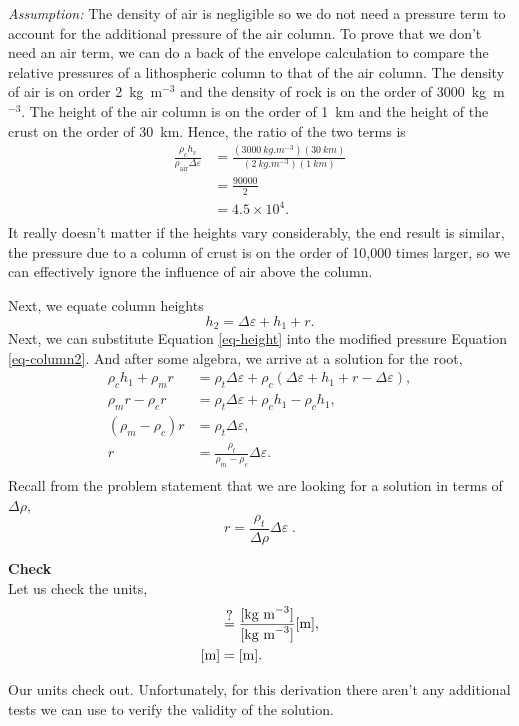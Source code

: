 \documentclass[final,a4paper,12pt]{article}
\newcommand\qeq{\stackrel{\mathclap{\normalfont\mbox{?}}}{=}}
\begin{document}
\begin{framed}
{\it Assumption:} The density of air is negligible so we do not need a pressure term to account for the additional pressure of the air column.  To prove that we don't need an air term, we can do a back of the envelope calculation to compare the relative pressures of a lithospheric column to that of the air column.  The density of air is on order 2~kg~m$^{-3}$ and the density of rock is on the order of 3000~kg~m$^{-3}$.  The height of the air column is on the order of 1~km and the height of the crust on the order of 30~km.  Hence, the ratio of the two terms is
\begin{align*}
    \frac{\rho_c h_c}{\rho_{\mathrm{air}} \Delta \varepsilon} &=
    \frac{(\SI{3000}{kg.m^{-3}})(\SI{30}{km})}
    {(\SI{2}{kg.m^{-3}})(\SI{1}{km})} \\
    &= \frac{90000}{2}\\
    &= 4.5 \times 10^{4}. \\
\end{align*}
It really doesn't matter if the heights vary considerably, the end result is similar, the pressure due to a column of crust is on the order of 10,000 times larger, so we can effectively ignore the influence of air above the column.
\end{framed}

Next, we equate column heights
\begin{equation}
    h_{2} = \Delta \varepsilon + h_{1} + r .
    \label{eq-height}
\end{equation}
Next, we can substitute Equation \ref{eq-height} into the modified pressure Equation \ref{eq-column2}.  And after some algebra, we arrive at a solution for
the root,
\begin{align*}
    \rho_{c} h_{1} + \rho_{m} r &= \rho_{t} \Delta \varepsilon
        + \rho_{c}(\Delta \varepsilon + h_{1} + r - \Delta \varepsilon), \\
    \rho_{m} r - \rho_{c} r &= \rho_{t} \Delta \varepsilon 
        + \rho_{c} h_{1} - \rho_{c} h_{1}, \\
    (\rho_{m} - \rho_{c}) r &= \rho_{t} \Delta \varepsilon, \\
    r &= \frac{\rho_{t}}{\rho_{m} - \rho_{c}} \Delta \varepsilon. \\
\end{align*}
Recall from the problem statement that we are looking for a solution in terms of $\Delta \rho$,
\begin{equation*}
\boxed{
    r = \frac{\rho_{t}}{\Delta \rho} \Delta \varepsilon
}\; .
\end{equation*}

{\bf Check}\\
Let us check the units,
\begin{align*}
    [\text{m}] &\qeq \frac{[\text{kg m}^{-3}]}{[\text{kg m}^{-3}]} [\text{m}], \\
    [\text{m}] &= [\text{m}].
\end{align*}

Our units check out.  Unfortunately, for this derivation there aren't any additional tests we can use to verify the validity of the solution.
\end{document}

